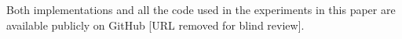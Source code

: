 \documentclass[9pt,preprint]{sigplanconf}
\begin{document}
Both implementations and all the code used in the experiments in this paper are available publicly on GitHub [URL removed for blind review].








\end{document}
